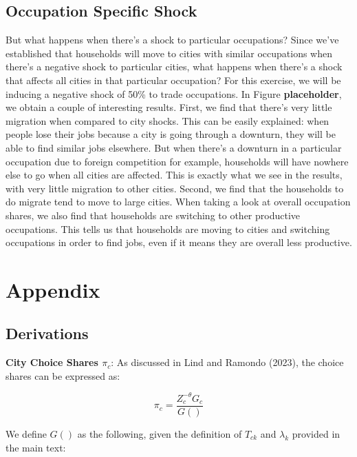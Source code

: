 \documentclass[10pt]{article}
\begin{document}
\subsection{Occupation Specific Shock}

But what happens when there's a shock to particular occupations? Since we've established that households will move to cities with similar occupations when there's a negative shock to particular cities, what happens when there's a shock that affects all cities in that particular occupation? For this exercise, we will be inducing a negative shock of 50\% to trade occupations. In Figure \textbf{placeholder}, we obtain a couple of interesting results. First, we find that there's very little migration when compared to city shocks. This can be easily explained: when people lose their jobs because a city is going through a downturn, they will be able to find similar jobs elsewhere. But when there's a downturn in a particular occupation due to foreign competition for example, households will have nowhere else to go when all cities are affected. This is exactly what we see in the results, with very little migration to other cities. Second, we find that the households to do migrate tend to move to large cities. When taking a look at overall occupation shares, we also find that households are switching to other productive occupations. This tells us that households are moving to cities and switching occupations in order to find jobs, even if it means they are overall less productive.

\newpage


\newpage

\section{Appendix}

\subsection{Derivations}

\noindent\textbf{City Choice Shares $\pi_{c}$}: As discussed in Lind and Ramondo (2023), the choice shares can be expressed as:

\begin{equation*}
    \pi_{c}=\frac{Z_{c}^{-\theta}{G_{c}}}{G()}
\end{equation*}

We define $G()$ as the following, given the definition of $T_{ck}$ and $\lambda_{k}$ provided in the main text:
\end{document}
